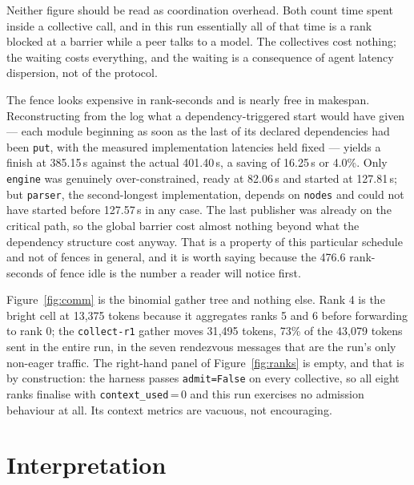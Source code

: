 \documentclass[11pt]{article}
\begin{document}
Neither figure should be read as coordination overhead. Both count time spent inside a collective
call, and in this run essentially all of that time is a rank blocked at a barrier while a peer
talks to a model. The collectives cost nothing; the waiting costs everything, and the waiting is a
consequence of agent latency dispersion, not of the protocol.

The fence looks expensive in rank-seconds and is nearly free in makespan. Reconstructing from the
log what a dependency-triggered start would have given --- each module beginning as soon as the
last of its declared dependencies had been \texttt{put}, with the measured implementation
latencies held fixed --- yields a finish at 385.15\,s against the actual 401.40\,s, a saving of
16.25\,s or 4.0\%. Only \texttt{engine} was genuinely over-constrained, ready at 82.06\,s and
started at 127.81\,s; but \texttt{parser}, the second-longest implementation, depends on
\texttt{nodes} and could not have started before 127.57\,s in any case. The last publisher was
already on the critical path, so the global barrier cost almost nothing beyond what the
dependency structure cost anyway. That is a property of this particular schedule and not of
fences in general, and it is worth saying because the 476.6 rank-seconds of fence idle is the
number a reader will notice first.

Figure~\ref{fig:comm} is the binomial gather tree and nothing else. Rank 4 is the bright cell at
13{,}375 tokens because it aggregates ranks 5 and 6 before forwarding to rank 0; the
\texttt{collect-r1} gather moves 31{,}495 tokens, 73\% of the 43{,}079 tokens sent in the entire
run, in the seven rendezvous messages that are the run's only non-eager traffic. The right-hand
panel of Figure~\ref{fig:ranks} is empty, and that is by construction: the harness passes
\texttt{admit=False} on every collective, so all eight ranks finalise with
\texttt{context\_used}\,=\,0 and this run exercises no admission behaviour at all. Its context
metrics are vacuous, not encouraging.

\section{Interpretation}
\end{document}
